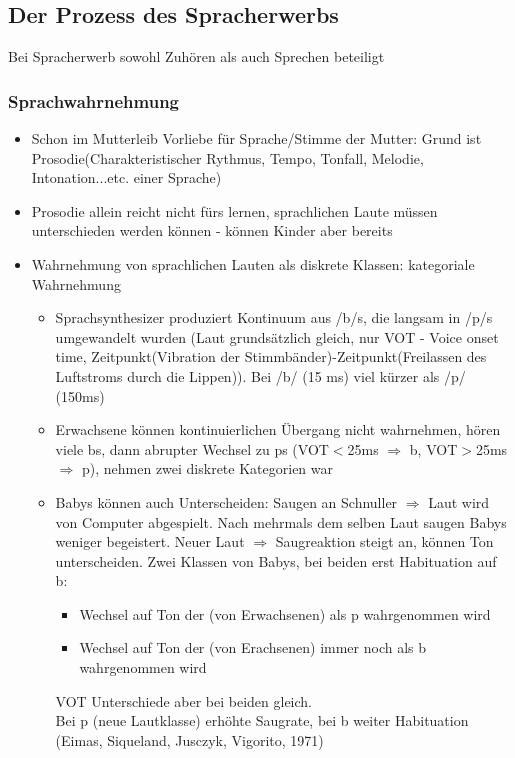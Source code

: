 \subsection{Der Prozess des Spracherwerbs}
Bei Spracherwerb sowohl Zuhören als auch Sprechen beteiligt
\subsubsection{Sprachwahrnehmung}
\begin{itemize}
	\item
		Schon im Mutterleib Vorliebe für Sprache/Stimme der Mutter: Grund ist Prosodie(Charakteristischer Rythmus, Tempo, Tonfall, Melodie, Intonation...etc. einer Sprache)
	\item
		Prosodie allein reicht nicht fürs lernen, sprachlichen Laute müssen unterschieden werden können - können Kinder aber bereits
	\item
		Wahrnehmung von sprachlichen Lauten als diskrete Klassen: kategoriale Wahrnehmung
		\begin{itemize}
			\item
				Sprachsynthesizer produziert Kontinuum aus /b/s, die langsam in /p/s umgewandelt wurden (Laut grundsätzlich gleich, nur VOT - Voice onset time, Zeitpunkt(Vibration der Stimmbänder)-Zeitpunkt(Freilassen des Luftstroms durch die Lippen)). Bei /b/ (15 ms) viel kürzer als /p/ (150ms)
			\item
				Erwachsene können kontinuierlichen Übergang nicht wahrnehmen, hören viele bs, dann abrupter Wechsel zu ps (VOT$<$25ms $\Rightarrow$ b, VOT$>$25ms $\Rightarrow$ p), nehmen zwei diskrete Kategorien war
			\item
				Babys können auch Unterscheiden: Saugen an Schnuller $\Rightarrow$ Laut wird von Computer abgespielt. Nach mehrmals dem selben Laut saugen Babys weniger begeistert. Neuer Laut $\Rightarrow$ Saugreaktion steigt an, können Ton unterscheiden. Zwei Klassen von Babys, bei beiden erst Habituation auf b:
				\begin{itemize}
					\item
						Wechsel auf Ton der (von Erwachsenen) als p wahrgenommen wird
					\item
						Wechsel auf Ton der (von Erachsenen) immer noch als b wahrgenommen wird
				\end{itemize}
				VOT Unterschiede aber bei beiden gleich.\\
				Bei p (neue Lautklasse) erhöhte Saugrate, bei b weiter Habituation (Eimas, Siqueland, Jusczyk, Vigorito, 1971)
		\end{itemize}

\end{itemize}
